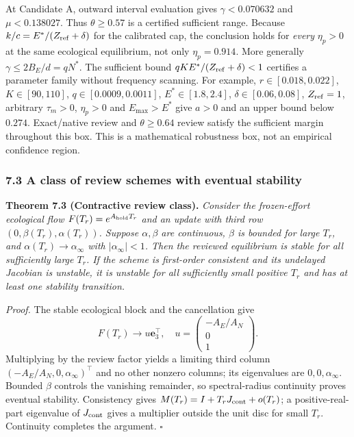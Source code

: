 At Candidate A, outward interval evaluation gives $\gamma<0.070632$ and $\mu<0.138027$. Thus $\theta\ge0.57$ is a certified sufficient range. Because $k/c=E^*/(Z_{\rm ref}+\delta)$ for the calibrated cap, the conclusion holds for \emph{every} $\eta_p>0$ at the same ecological equilibrium, not only $\eta_p=0.914$. More generally $\gamma\le2B_E/d=qN^*$. The sufficient bound $qKE^*/(Z_{\rm ref}+\delta)<1$ certifies a parameter family without frequency scanning. For example, $r\in[0.018,0.022]$, $K\in[90,110]$, $q\in[0.0009,0.0011]$, $E^*\in[1.8,2.4]$, $\delta\in[0.06,0.08]$, $Z_{\rm ref}=1$, arbitrary $\tau_m>0$, $\eta_p>0$ and $E_{\max}>E^*$ give $a>0$ and an upper bound below $0.274$. Exact/native review and $\theta\ge0.64$ review satisfy the sufficient margin throughout this box. This is a mathematical robustness box, not an empirical confidence region.

\subsubsection{7.3 A class of review schemes with eventual stability}

\textbf{Theorem 7.3 (Contractive review class).}
\emph{Consider the frozen-effort ecological flow $F(T_r)=e^{A_{\rm hold}T_r}$ and an update with third row $(0,\beta(T_r),\alpha(T_r))$. Suppose $\alpha,\beta$ are continuous, $\beta$ is bounded for large $T_r$, and $\alpha(T_r)\to\alpha_\infty$ with $|\alpha_\infty|<1$. Then the reviewed equilibrium is stable for all sufficiently large $T_r$. If the scheme is first-order consistent and its undelayed Jacobian is unstable, it is unstable for all sufficiently small positive $T_r$ and has at least one stability transition.}

\emph{Proof.} The stable ecological block and the cancellation give
\[
F(T_r)\longrightarrow u\mathbf e_3^\top,\quad
u=\begin{pmatrix}-A_E/A_N\\0\\1\end{pmatrix}.
\]
Multiplying by the review factor yields a limiting third column $(-A_E/A_N,0,\alpha_\infty)^\top$ and no other nonzero columns; its eigenvalues are $0,0,\alpha_\infty$. Bounded $\beta$ controls the vanishing remainder, so spectral-radius continuity proves eventual stability. Consistency gives $M(T_r)=I+T_rJ_{\rm cont}+o(T_r)$; a positive-real-part eigenvalue of $J_{\rm cont}$ gives a multiplier outside the unit disc for small $T_r$. Continuity completes the argument. \ensuremath{\square}

